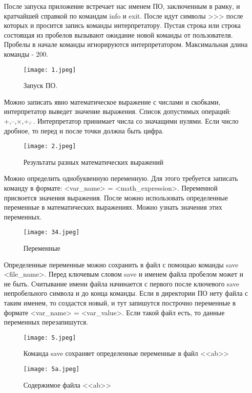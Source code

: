 \documentclass[a4paper,14pt]{extarticle}
\begin{document}
После запуска приложение встречает нас именем ПО, заключенным в рамку, и кратчайшей справкой по
командам info и exit. После идут символы {>}{>}{>} после которых и просится запись команды интерпретатору.
Пустая строка или строка состоящая из пробелов вызывают ожидание новой команды от пользователя.
Пробелы в начале команды игнорируются интерпретатором. Максимальная длина команды - 200.
\begin{figure}[h!]
	\begin{center}
		\texttt{[image: 1.jpeg]}
	\end{center}
	\caption{Запуск ПО.}
\end{figure}

Можно записать явно математическое выражение с числами и скобками, интерпретатор выведет значение выражения. Список
допустимых операций: +,–,×,÷,\,{$\hat{} $}\,{.} Интерпретатор принимает числа со значащими нулями. Если число дробное, то перед и после точки должна быть цифра.
\begin{figure}[h!]
	\begin{center}
		\texttt{[image: 2.jpeg]}
	\end{center}
	\caption{Результаты разных математических выражений}
\end{figure}

Можно определить однобуквенную переменную. Для этого требуется записать команду в формате: <var\_name> = <math\_expression>.
Переменной присвоется значения выражения.
После можно использовать определенные переменные в математических выражениях. Можно узнать значения этих переменных.
\begin{figure}[h!]
	\begin{center}
		\texttt{[image: 34.jpeg]}
	\end{center}
	\caption{Переменные}
\end{figure}

Определенные переменные можно сохранить в файл с помощью команды save <file\_name>. Перед ключевым словом save и именем файла
пробелом может и не быть. Считывание имени файла начинается с первого после ключевого save непробельного символа и до конца команды.
Если в директории ПО нету файла с таким именем, то создастся новый, и тут запишутся построчно переменные в формате <var\_name> = <var\_value>. Если такой файл есть, то данные переменных перезапишутся.
\begin{figure}[h!]
	\begin{center}
		\texttt{[image: 5.jpeg]}
	\end{center}
	\caption{Команда save сохраняет определенные переменные в файл <<ab>>}
\end{figure}
\begin{figure}[h!]
	\begin{center}
		\texttt{[image: 5a.jpeg]}
	\end{center}
	\caption{Содержимое файла <<ab>>}
\end{figure}
\end{document}
